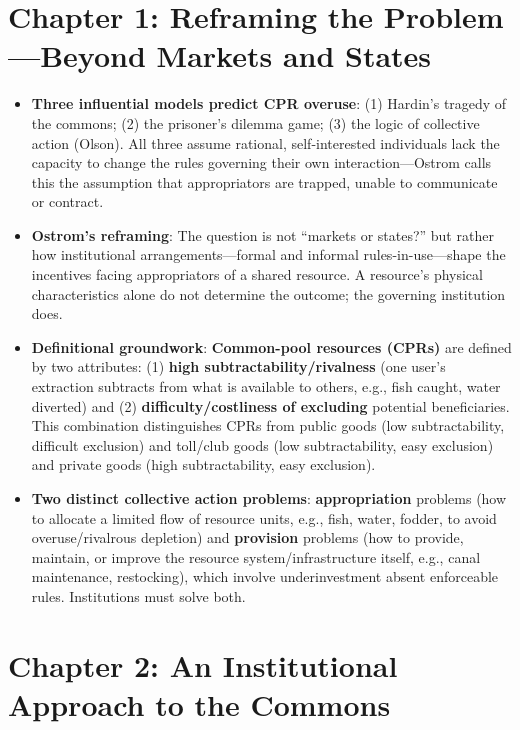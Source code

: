 \documentclass[12pt]{article}
\begin{document}
\section{Chapter 1: Reframing the Problem---Beyond Markets and States}

\begin{itemize}[leftmargin=*, itemsep=4pt]
    \item \textbf{Three influential models predict CPR overuse}: (1) Hardin's tragedy of the commons; (2) the prisoner's dilemma game; (3) the logic of collective action (Olson). All three assume rational, self-interested individuals lack the capacity to change the rules governing their own interaction---Ostrom calls this the assumption that appropriators are trapped, unable to communicate or contract.
    \item \textbf{Ostrom's reframing}: The question is not ``markets or states?'' but rather how institutional arrangements---formal and informal rules-in-use---shape the incentives facing appropriators of a shared resource. A resource's physical characteristics alone do not determine the outcome; the governing institution does.
    \item \textbf{Definitional groundwork}: \textbf{Common-pool resources (CPRs)} are defined by two attributes: (1) \textbf{high subtractability/rivalness} (one user's extraction subtracts from what is available to others, e.g., fish caught, water diverted) and (2) \textbf{difficulty/costliness of excluding} potential beneficiaries. This combination distinguishes CPRs from public goods (low subtractability, difficult exclusion) and toll/club goods (low subtractability, easy exclusion) and private goods (high subtractability, easy exclusion).
    \item \textbf{Two distinct collective action problems}: \textbf{appropriation} problems (how to allocate a limited flow of resource units, e.g., fish, water, fodder, to avoid overuse/rivalrous depletion) and \textbf{provision} problems (how to provide, maintain, or improve the resource system/infrastructure itself, e.g., canal maintenance, restocking), which involve underinvestment absent enforceable rules. Institutions must solve both.
\end{itemize}

\section{Chapter 2: An Institutional Approach to the Commons}
\end{document}
